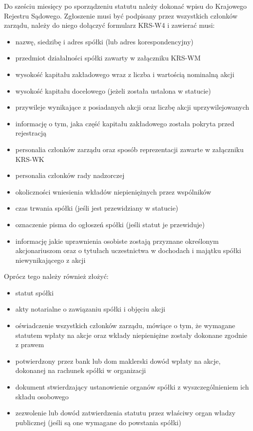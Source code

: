 \documentclass[11pt]{article}
\begin{document}
	Do sześciu miesięcy po sporządzeniu statutu należy dokonać wpisu do Krajowego Rejestru Sądowego. Zgłoszenie musi być podpisany przez wszystkich członków zarządu, należy do niego dołączyć formularz KRS-W4 i zawierać musi:
	\begin{itemize}
	
	\item nazwę, siedzibę i adres spółki (lub adres korespondencyjny)
	\item przedmiot działalności spółki zawarty w załączniku KRS-WM
	\item wysokość kapitału zakładowego wraz z liczba i wartością nominalną akcji
	\item wysokość kapitału docelowego (jeżeli została ustalona w statucie)
	\item przywileje wynikające z posiadanych akcji oraz liczbę akcji uprzywilejowanych
	\item informację o tym, jaka część kapitału zakładowego została pokryta przed rejestracją 
	\item personalia członków zarządu oraz sposób reprezentacji zawarte w załączniku KRS-WK
	\item personalia członków rady nadzorczej
	\item okoliczności wniesienia wkładów niepieniężnych przez wspólników
	\item czas trwania spółki (jeśli jest przewidziany w statucie)
	\item oznaczenie pisma do ogłoszeń spółki (jeśli statut je przewiduje)
	\item informację jakie uprawnienia osobiste zostają przyznane określonym akcjonariuszom oraz o tytułach uczestnictwa w dochodach i majątku spółki niewynikającego z akcji

	\end{itemize}
	
	Oprócz tego należy również złożyć:
	
	\begin{itemize}
	
	\item statut spółki
	\item akty notarialne o zawiązaniu spółki i objęciu akcji
	\item oświadczenie wszystkich członków zarządu, mówiące o tym, że wymagane statutem wpłaty na akcje oraz wkłady niepieniężne zostały dokonane zgodnie z prawem
	\item potwierdzony przez bank lub dom maklerski dowód wpłaty na akcje, dokonanej na rachunek spółki w organizacji
	\item dokument stwierdzający ustanowienie organów spółki z wyszczególnieniem ich składu osobowego
	\item zezwolenie lub dowód zatwierdzenia statutu przez właściwy organ władzy publicznej (jeśli są one wymagane do powstania spółki)

	\end{itemize}
	
\end{document}
